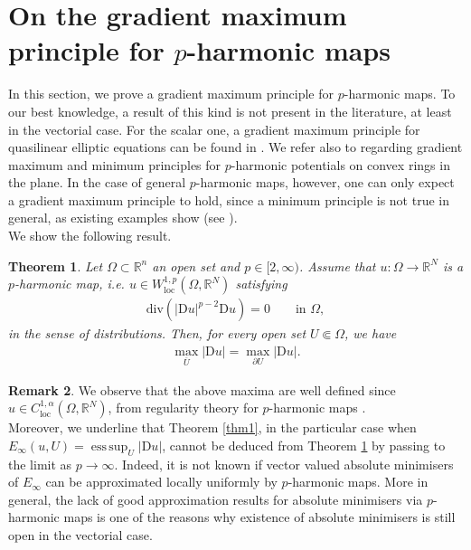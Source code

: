 \documentclass[a4paper,11pt]{article}
\numberwithin{equation}{section}
\newtheorem{Theorem}{Theorem}[section]
\newcommand{\numberset}{\mathbb}
\newcommand{\Om}{\Omega}
\newcommand{\R}{\numberset{R}}
\newcommand{\rom}{\mathrm}
\DeclareMathOperator*{\esssup}{ess\,sup}
\theoremstyle{definition}
\newtheorem{Remark}[Theorem]{Remark}
\begin{document}
\section{On the gradient maximum principle for $p$-harmonic maps}\label{sec grad}
In this section, we prove a gradient maximum principle for $p$-harmonic maps. To our best knowledge, a result of this kind is not present in the literature, at least in the vectorial case. For the scalar one, a gradient maximum principle for quasilinear elliptic equations can be found in \cite[Chapter 15]{GT}. We refer also to \cite[Appendix B]{PZZ} regarding gradient maximum and minimum principles for $p$-harmonic potentials on convex rings in the plane. In the case of general $p$-harmonic maps, however, one can only expect a gradient maximum principle to hold, since a minimum principle is not true in general, as existing examples show (see \cite{BBDS}).\\
We show the following result.
\begin{Theorem}\label{thm p}
Let $\Om\subset\R^n$ an open set and $p\in[2,\infty)$. Assume that $u:\Om\to\R^N$ is a $p$-harmonic map, i.e. $u\in W^{1,p}_{\mathrm{loc}}(\Om,\R^N)$ satisfying
\begin{align}\label{p eq}
\mathrm{div} (|\rom Du|^{p-2}\rom Du)=0\qquad\mbox{in }\Om,
\end{align}
in the sense of distributions. Then, for every open set $U\Subset \Om$, we have
\begin{align}\label{GMP}
\max_{\overline U}|\rom Du|=\max_{\partial U}|\rom Du|.
\end{align}
\end{Theorem}

\begin{Remark}
We observe that the above maxima are well defined since $u\in C^{1,\alpha}_{\mathrm{loc}}(\Om,\R^N)$, from regularity theory for $p$-harmonic maps \cite{U}.\\
Moreover, we underline that Theorem \ref{thm1}, in the particular case when $E_\infty(u,U)=\esssup_U|\rom Du|$, cannot be deduced from Theorem \ref{thm p} by passing to the limit as $p\to \infty$. Indeed, it is not known if vector valued absolute minimisers of $E_\infty$ can be approximated locally uniformly by $p$-harmonic maps. More in general, the lack of good approximation results for absolute minimisers via $p$-harmonic maps is one of the reasons why existence of absolute minimisers is still open in the vectorial case. 
\end{Remark}
\end{document}
